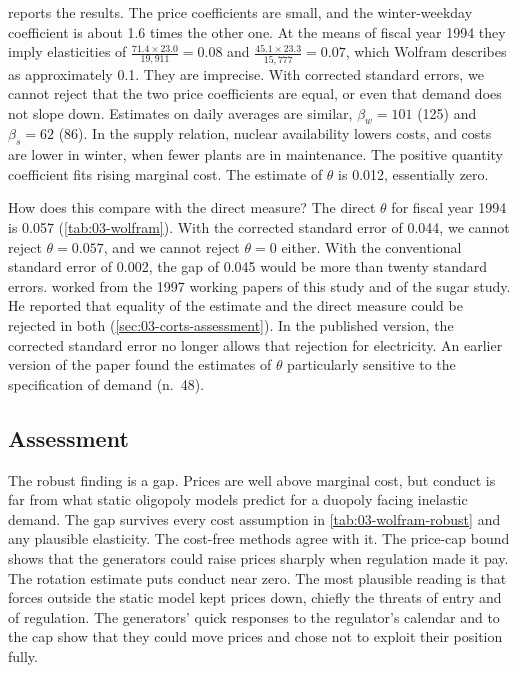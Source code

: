  reports the results. The price coefficients are small, and the winter-weekday coefficient is
about 1.6 times the other one. At the means of fiscal year 1994 they imply elasticities of
$\frac{71.4 \times 23.0}{19{,}911} = 0.08$ and $\frac{45.1 \times 23.3}{15{,}777} = 0.07$, which Wolfram describes as
approximately 0.1. They are imprecise. With corrected standard errors, we cannot reject that the two price coefficients
are equal, or even that demand does not slope down. Estimates on daily averages are similar, $\beta_w = 101$ (125) and
$\beta_s = 62$ (86). In the supply relation, nuclear availability lowers costs, and costs are lower in winter, when
fewer plants are in maintenance. The positive quantity coefficient fits rising marginal cost. The estimate of $\theta$ is
0.012, essentially zero.

How does this compare with the direct measure? The direct $\theta$ for fiscal year 1994 is 0.057
(\cref{tab:03-wolfram}). With the corrected standard error of 0.044, we cannot reject $\theta = 0.057$, and we cannot
reject $\theta = 0$ either. With the conventional standard error of 0.002, the gap of 0.045 would be more than twenty
standard errors. \citet[p.~245]{Corts1999} worked from the 1997 working papers of this study and of the sugar study. He
reported that equality of the estimate and the direct measure could be rejected in both
(\cref{sec:03-corts-assessment}). In the published version, the corrected standard error no longer allows that rejection
for electricity. An earlier version of the paper found the estimates of
$\theta$ particularly sensitive to the specification of demand (n.~48).

\subsection{Assessment}\label{sec:03-wolfram-assessment}

The robust finding is a gap. Prices are well above marginal cost, but conduct is far from what static oligopoly models
predict for a duopoly facing inelastic demand. The gap survives every cost assumption in \cref{tab:03-wolfram-robust} and
any plausible elasticity. The cost-free methods agree with it. The price-cap bound shows that the generators could
raise prices sharply when regulation made it pay. The rotation estimate puts conduct near zero. The most plausible
reading is that forces outside the static model kept prices down, chiefly the threats of entry and of regulation. The
generators' quick responses to the regulator's calendar and to the cap show that they could move prices and chose not
to exploit their position fully.

